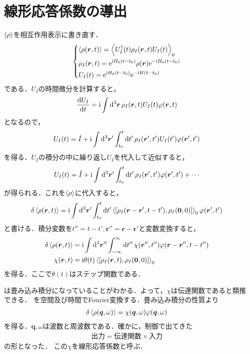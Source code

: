 \documentclass{ltjarticle}
\begin{document}
\section{線形応答係数の導出}
$\ev{\rho}$を相互作用表示に書き直す．
\begin{align}
  \begin{dcases}
    \ev{\rho(\bm{r},t)} = \ev{U_I^{\dagger}(t)\rho_I(\bm{r},t)U_I(t)}_0\\
    \rho_I(\bm{r},t) = \e^{\i H_0 (t-t_0)} \rho(\bm{r}) \e^{-\i H_0 (t-t_0)}\\
    U_I(t) = \e^{\i H_0 (t-t_0)} \e^{-\i H (t-t_0)}
  \end{dcases}
\end{align}
である．$U_I$の時間微分を計算すると，
\begin{align}
  \dv{U_I}{t} = \mathrm{i} \int \dd[3]{\bm{r}} \rho_I(\bm{r},t) U_I(t) \varphi(\bm{r},t)
\end{align}
となるので，
\begin{align}
  U_I(t) = \hat{I} + \mathrm{i} \int \dd[3]{\bm{r}'} \int_{t_0}^{t} \dd{t'} \rho_I(\bm{r}',t') U_I(t') \varphi(\bm{r}',t')
\end{align}
を得る．$U_I$の積分の中に繰り返し$U_I$を代入して近似すると，
\begin{align}
  U_I(t) = \hat{I} + \mathrm{i} \int \dd[3]{\bm{r}'} \int_{t_0}^{t} \dd{t'} \rho_I(\bm{r}',t') \varphi(\bm{r}',t') + \cdots
\end{align}
が得られる．これを$\ev{\rho}$に代入すると，
\begin{align}
  \delta \ev{\rho(\bm{r},t)} = \i \int \dd[3]{\bm{r}'} \int_{t_0}^{t} \dd{t'} \ev{\qty[\rho_I(\bm{r} - \bm{r}',t-t'), \rho_I(\bm{0}, 0)]}_0\phi(\bm{r}',t')
\end{align}
と書ける．積分変数を$t'' = t - t',\bm{r}'' = \bm{r} - \bm{r}'$と変数変換すると，
\begin{align}
  \delta \ev{\rho(\bm{r},t)} &= \i \int \dd[3]{\bm{r}''} \int_{-\infty}^{\infty} \dd{t''} \chi(\bm{r}'',t'')\phi(\bm{r} - \bm{r}'',t - t'')\\
  \chi(\bm{r},t) &= \i \theta(t) \ev{\qty[\rho_I(\bm{r},t),\rho_I(\bm{0},0)]}_0 \label{eq:combolution}
\end{align}
を得る．ここで$\theta(t)$はステップ関数である．

は畳み込み積分になっていることがわかる．よって，$\chi$は伝達関数であると類推できる．
を空間及び時間でFourier変換する．畳み込み積分の性質より
\begin{align}
  \delta \ev{\rho(\bm{q},\omega)} = \chi(\bm{q},\omega)\phi(\bm{q},\omega)
\end{align}
を得る．$\bm{q},\omega$は波数と周波数である．確かに，制御で出てきた
\begin{align}
  \text{出力} = \text{伝達関数} \times \text{入力}
\end{align}
の形となった．
この$\chi$を線形応答係数と呼ぶ．
\end{document}
